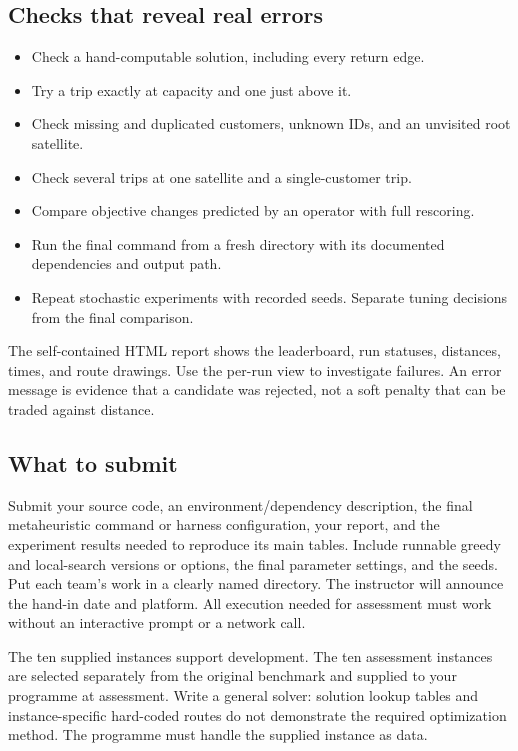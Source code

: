 \documentclass[11pt,a4paper]{article}
\begin{document}
\subsection{Checks that reveal real errors}
\begin{itemize}
\item Check a hand-computable solution, including every return edge.
\item Try a trip exactly at capacity and one just above it.
\item Check missing and duplicated customers, unknown IDs, and an unvisited root satellite.
\item Check several trips at one satellite and a single-customer trip.
\item Compare objective changes predicted by an operator with full rescoring.
\item Run the final command from a fresh directory with its documented dependencies and output path.
\item Repeat stochastic experiments with recorded seeds. Separate tuning decisions from the final comparison.
\end{itemize}
The self-contained HTML report shows the leaderboard, run statuses, distances, times, and route drawings. Use the per-run view to investigate failures. An error message is evidence that a candidate was rejected, not a soft penalty that can be traded against distance.

\subsection{What to submit}
Submit your source code, an environment/dependency description, the final metaheuristic command or harness configuration, your report, and the experiment results needed to reproduce its main tables. Include runnable greedy and local-search versions or options, the final parameter settings, and the seeds. Put each team's work in a clearly named directory. The instructor will announce the hand-in date and platform. All execution needed for assessment must work without an interactive prompt or a network call.

The ten supplied instances support development. The ten assessment instances are selected separately from the original benchmark and supplied to your programme at assessment. Write a general solver: solution lookup tables and instance-specific hard-coded routes do not demonstrate the required optimization method. The programme must handle the supplied instance as data.
\end{document}
